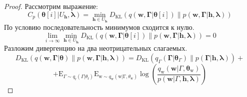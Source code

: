 \documentclass[12pt]{article}
\numberwithin{equation}{section}
\begin{document}
	\begin{proof}
		Рассмотрим выражение:
		$$C_{p}\left(\boldsymbol{\theta}[i] | U_{\mathbf{h}}, \boldsymbol{\lambda}\right) = \min _{\mathbf{h} \in U_{\mathbf{h}}} D_{\mathrm{KL}}(q(\mathbf{w}, \mathbf{\Gamma} | \boldsymbol{\theta}[i]) \| p(\mathbf{w}, \mathbf{\Gamma} | \mathbf{h}, \boldsymbol{\lambda}))$$
		По условию последовательность минимумов сходится к нулю. 
		$$\lim _{i \rightarrow \infty}  \min _{\mathbf{h} \in U_{\mathbf{h}}} D_{\mathrm{KL}}(q(\mathbf{w}, \mathbf{\Gamma} | \boldsymbol{\theta}[i]) \| p(\mathbf{w}, \mathbf{\Gamma} | \mathbf{h}, \boldsymbol{\lambda})) =0 $$
		Разложим дивергенцию на два неотрицательных слагаемых.
		$$D_{\mathrm{KL}}(q(\mathbf{w}, \mathbf{\Gamma} | \boldsymbol{\theta}) \| p(\mathbf{w}, \mathbf{\Gamma} | \mathbf{h}, \boldsymbol{\lambda}))= D_{\mathrm{KL}}\left(q_{\Gamma}\left(\boldsymbol{\Gamma} | \boldsymbol{\theta}_{\Gamma}\right) \| p(\boldsymbol{\Gamma} | \mathbf{h}, \boldsymbol{\lambda})\right)+ $$
		$$+\mathrm{E}_{\Gamma \sim q_{\mathrm{r}}\left(\Gamma | \theta_{\mathrm{r}}\right)} \mathrm{E}_{\mathrm{w} \sim q_{\mathrm{w}}\left(\mathrm{w} | \mathrm{\Gamma}, \theta_{\mathrm{w}}\right)} \log \left(\frac{q_{\mathrm{w}}\left(\mathbf{w} | \Gamma, \boldsymbol{\theta}_{\mathrm{w}}\right)}{p(\mathbf{w} | \Gamma, \mathbf{h}, \boldsymbol{\lambda})}\right)$$
		


\end{proof}
\end{document}
